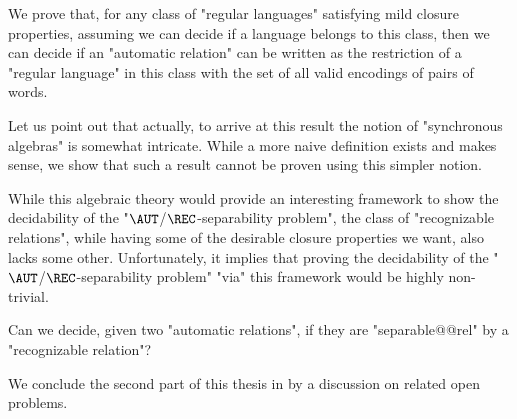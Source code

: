 \begin{contribution}
	We prove that, for any class of "regular languages" satisfying mild closure
	properties, assuming we can decide if a language belongs to this class,
	then we can decide if an "automatic relation" can be written as the restriction
	of a "regular language" in this class with the set of all valid encodings
	of pairs of words.
\end{contribution}

Let us point out that actually, to arrive at this result the notion
of "synchronous algebras" is somewhat intricate. While a more naive definition
exists and makes sense, we show that such a result cannot be proven using this
simpler notion.

While this algebraic theory would provide an interesting framework to
show the decidability of the "$\AUT$/$\REC$-separability problem",
the class of "recognizable relations", while having some of the desirable
closure properties we want, also lacks some other.
Unfortunately, it implies that proving the decidability of
the "$\AUT$/$\REC$-separability problem" "via" this framework would
be highly non-trivial.

\begin{openproblemintro}
	Can we decide, given two "automatic relations", if they are "separable@@rel"
	by a "recognizable relation"?
\end{openproblemintro}

We conclude the second part of this thesis in 
by a discussion on related open problems.
